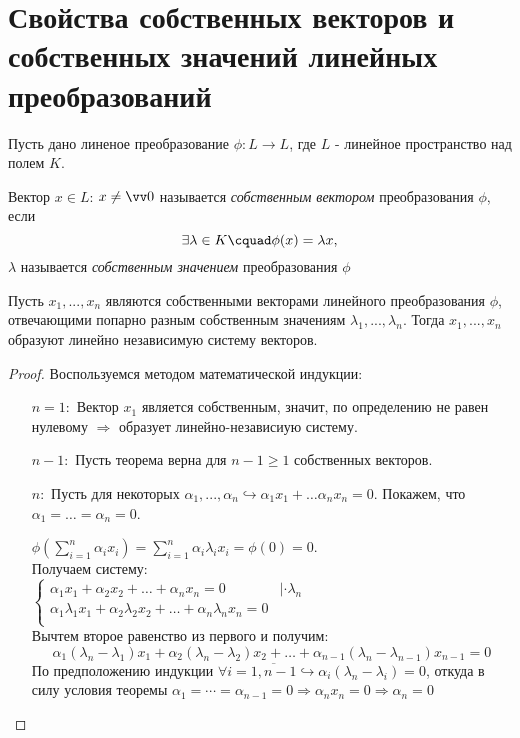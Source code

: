 \section{Свойства собственных векторов и собственных значений линейных преобразований}
Пусть дано линеное преобразование $\phi: L \rightarrow L$, где $L$ - линейное пространство над полем $K$.
\begin{defn}
Вектор $x \in L$: $x \neq \vv 0$ называется \textit{собственным вектором} преобразования $\phi$, если 
\begin{equation}
\exists \lambda \in K\cquad \phi(x)=\lambda x,
\end{equation}
$\lambda$ называется \textit{собственным значением} преобразования $\phi$ 
\end{defn}
\begin{thm}
Пусть $x_1,...,x_n$ являются собственными векторами линейного преобразования $\phi$, отвечающими попарно разным собственным значениям $\lambda_1,...,\lambda_n$. Тогда $x_1,...,x_n$ образуют линейно независимую систему векторов.
\end{thm}
\begin{proof}
Воспользуемся методом математической индукции:
\linebreak\vspace*{-\baselineskip}
\begin{itemize}
\item[\underline{$n=1:$}] Вектор $x_1$ является собственным, значит, по определению не равен нулевому $\Rightarrow$ образует линейно-независиую систему.
\item[\underline{$n-1:$}] Пусть теорема верна для $n-1\ge 1$ собственных векторов.

\item[\underline{$n:$}] Пусть для некоторых $\alpha_1,...,\alpha_n \hookrightarrow \alpha_1 x_1 + \ldots \alpha_n x_n = 0$. Покажем, что $\alpha_1=\ldots=\alpha_n=0$.

$\phi(\sum_{i=1}^n \alpha_i x_i)=\sum_{i=1}^n \alpha_i \lambda_i x_i = \phi(0)=0$. \\
Получаем систему: \\
$\begin{cases}
\alpha_1 x_1 + \alpha_2 x_2 + \ldots + \alpha_n x_n = 0 & |\cdot \lambda_n \\
\alpha_1 \lambda_1 x_1 + \alpha_2 \lambda_2 x_2 + \ldots + \alpha_n \lambda_n x_n = 0 \\
\end{cases}$ \\
Вычтем второе равенство из первого и получим:
\begin{equation*}
\alpha_1 (\lambda_n-\lambda_1) x_1 + \alpha_2 (\lambda_n-\lambda_2) x_2 + \ldots + \alpha_{n-1} (\lambda_n-\lambda_{n-1}) x_{n-1} = 0
\end{equation*}
По предположению индукции $\forall i=\overline{1,n-1} \hookrightarrow \alpha_i(\lambda_n-\lambda_i)=0$, откуда в силу условия теоремы $\alpha_1=\cdots=\alpha_{n-1}=0 \Rightarrow \alpha_n x_n=0 \Rightarrow \alpha_n=0$
\end{itemize}
\vspace{-1.65\baselineskip}
\end{proof}
